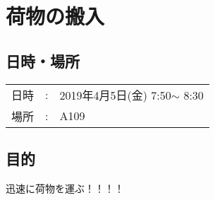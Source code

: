 %

\section{荷物の搬入}

\subsection{日時・場所}

\begin{tabular}{p{}rp{}}
  日時 & : & 2019年4月5日(金) 7:50$\sim$ 8:30\\
  場所 & : & A109
\end{tabular}

\subsection{目的}
迅速に荷物を運ぶ！！！！

